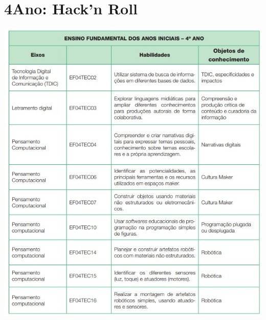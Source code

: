 \chapter[ 4\textordmasculine\space Ano: Hack'n Roll]{4\textordmasculine\space Ano: Hack'n Roll}



\pagebreak

%

\pagebreak

\begin{center}
	\includegraphics[height=\textheight]{./IMG/ano-4.jpeg}
\end{center}

\pagebreak

